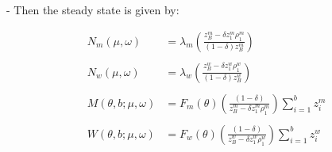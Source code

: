 - Then the steady state is given by:

$$
\begin{aligned}N_m(\mu,\omega)&=\lambda_m\left(\frac{z^m_B-\delta z^m_1\rho^m_1}{(1-\delta)z^m_B}\right)\\\\N_w(\mu,\omega)&=\lambda_w\left(\frac{z^w_B-\delta z^w_1\rho^w_1}{(1-\delta)z^w_B}\right)\\\\M(\theta,b;\mu,\omega)&=F_m(\theta) \left(\frac{(1-\delta)}{z^m_B-\delta z^m_1\rho^m_1}\right)\sum^b_{i=1} z^m_i\\\\W(\theta,b;\mu,\omega)&=F_w(\theta)\left(\frac{(1-\delta)}{z^w_B-\delta z^w_1\rho^w_1}\right)\sum^b_{i=1} z^w_i \end{aligned}
$$